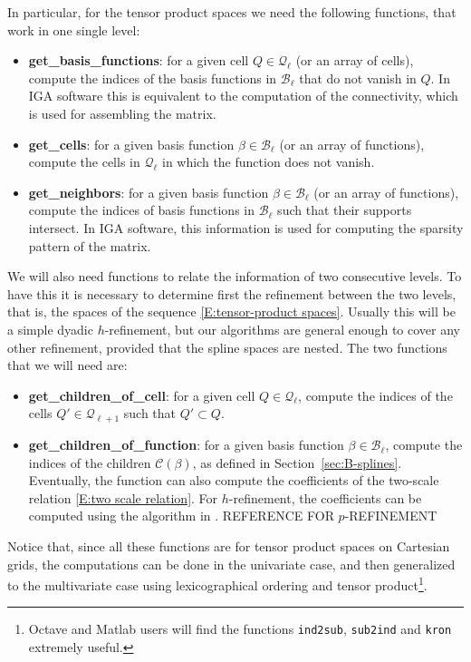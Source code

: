 \documentclass[a4paper]{siamltex1213}
\newcommand{\Rd}{\color{red}}
\newcommand\BB{\mathcal B}
\newcommand\QQ{\mathcal Q}
\newcommand\CC{\mathcal C}
\begin{document}
In particular, for the tensor product spaces we need the following functions, that work in one single level:
\begin{itemize}
\item {\bf get\_basis\_functions}: for a given cell $Q \in \QQ_\ell$ (or an array of cells), compute the indices of the basis functions in $\BB_\ell$ that do not vanish in $Q$. In IGA software this is equivalent to the computation of the connectivity, which is used for assembling the matrix.
\item {\bf get\_cells}: for a given basis function $\beta \in \BB_\ell$ (or an array of functions), compute the cells in $\QQ_\ell$ in which the function does not vanish.
\item {\bf get\_neighbors}: for a given basis function $\beta \in \BB_\ell$ (or an array of functions), compute the indices of basis functions in $\BB_\ell$ such that their supports intersect. In IGA software, this information is used for computing the sparsity pattern of the matrix.
\end{itemize}

We will also need functions to relate the information of two consecutive levels. To have this it is necessary to determine first the refinement between the two levels, that is, the spaces of the sequence \eqref{E:tensor-product spaces}. Usually this will be a simple dyadic $h$-refinement, but our algorithms are general enough to cover any other refinement, provided that the spline spaces are nested. The two functions that we will need are: 
\begin{itemize}
\item {\bf get\_children\_of\_cell}: for a given cell $Q \in \QQ_\ell$, compute the indices of the cells $Q' \in \QQ_{\ell+1}$ such that $Q' \subset Q$.
\item {\bf get\_children\_of\_function}: for a given basis function $\beta \in \BB_\ell$, compute the indices of the children $\CC(\beta)$, as defined in Section~\ref{sec:B-splines}. Eventually, the function can also compute the coefficients of the two-scale relation \eqref{E:two scale relation}. For $h$-refinement, the coefficients can be computed using the algorithm in \cite{CR07}. {\Rd REFERENCE FOR $p$-REFINEMENT}
\end{itemize}

Notice that, since all these functions are for tensor product spaces on Cartesian grids, the computations can be done in the univariate case, and then generalized to the multivariate case using lexicographical ordering and tensor product\footnote{Octave and Matlab users will find the functions \texttt{ind2sub}, \texttt{sub2ind} and \texttt{kron} extremely useful.}.
\end{document}
